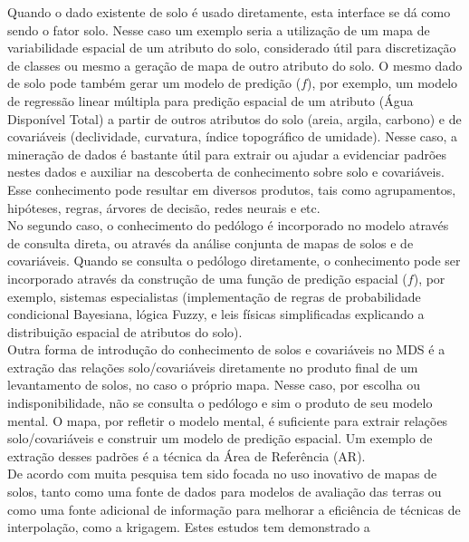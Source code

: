 Quando o dado existente de solo é usado diretamente, esta interface se dá como sendo o fator solo. Nesse caso um exemplo seria a utilização de um mapa de
variabilidade espacial de um atributo do solo, considerado útil para discretização de classes ou mesmo a geração de mapa de outro atributo do solo. O mesmo dado de solo pode também gerar um modelo de predição ($f$), por exemplo, um modelo de regressão linear múltipla para predição espacial de um atributo (Água Disponível Total) a partir de outros atributos do solo (areia, argila, carbono) e de covariáveis (declividade, curvatura, índice topográfico de umidade). Nesse caso, a
mineração de dados é bastante útil para extrair ou ajudar a evidenciar padrões nestes dados e auxiliar na descoberta de conhecimento sobre solo e covariáveis. Esse conhecimento pode resultar em diversos produtos, tais como agrupamentos, hipóteses, regras, árvores de decisão, redes neurais e etc.\\
No segundo caso, o conhecimento do pedólogo é incorporado no modelo através de consulta direta, ou através da análise conjunta de mapas de solos e de covariáveis. Quando se consulta o pedólogo diretamente, o conhecimento pode ser incorporado através da construção de uma função de predição espacial ($f$), por exemplo, sistemas especialistas (implementação de regras de probabilidade condicional Bayesiana, lógica Fuzzy, e leis físicas simplificadas explicando a distribuição espacial de atributos do solo).\\
Outra forma de introdução do conhecimento de solos e covariáveis no MDS é a extração das relações solo/covariáveis diretamente no produto final de um levantamento de solos, no caso o próprio mapa. Nesse caso, por escolha ou indisponibilidade, não se consulta o pedólogo e sim o produto de seu modelo mental. O mapa, por refletir o modelo mental, é suficiente para extrair relações solo/covariáveis e construir um modelo de predição espacial. Um exemplo de extração desses padrões é a técnica da Área de Referência (AR).\\
De acordo com \cite{LagacherieEtAl:1995} muita pesquisa tem sido focada no uso inovativo de mapas de solos, tanto como uma fonte de dados para modelos de avaliação das terras ou como uma fonte adicional de informação para melhorar a eficiência de técnicas de interpolação, como a krigagem. Estes estudos tem demonstrado a
